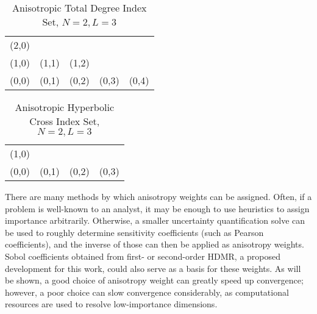 \begin{table}[h]
  \centering
  \begin{tabular}{c c c c c}
    (2,0) &       &       &       & \\
    (1,0) & (1,1) & (1,2) &       & \\
    (0,0) & (0,1) & (0,2) & (0,3) & (0,4)
  \end{tabular}
  \caption{Anisotropic Total Degree Index Set, $N=2,L=3$}
  \label{tab:aniTD}
\end{table}

\begin{table}[h]
  \centering
  \begin{tabular}{c c c c}
    (1,0) &       &       &       \\
    (0,0) & (0,1) & (0,2) & (0,3)
  \end{tabular}
  \caption{Anisotropic Hyperbolic Cross Index Set, $N=2,L=3$}
  \label{tab:aniHC}
\end{table}

There are many methods by which anisotropy weights can be assigned.  Often, if a problem is well-known to an 
analyst, it may be enough to use heuristics to assign importance arbitrarily.  Otherwise, a smaller
uncertainty quantification solve can be used to roughly determine sensitivity coefficients (such as Pearson
coefficients), and the inverse of those can then be applied as anisotropy weights.  Sobol coefficients
obtained from first- or second-order HDMR, a proposed development for this work, could also serve as a basis for these weights.
As will be shown, a good choice of anisotropy weight can greatly speed up convergence; however, a
poor choice can slow convergence considerably, as computational resources are used to resolve low-importance
dimensions.


